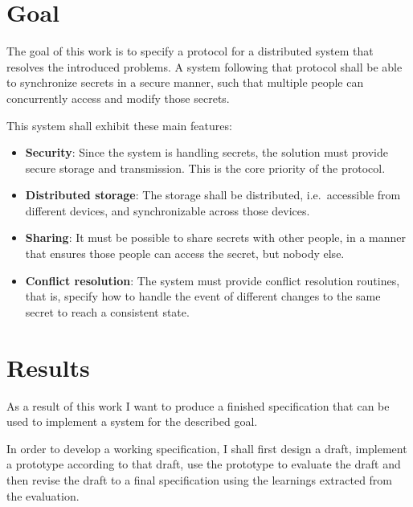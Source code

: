 \section{Goal}

The goal of this work is to specify a protocol for a distributed system that
resolves the introduced problems. A system following that protocol shall be
able to synchronize secrets in a secure manner, such that multiple people can
concurrently access and modify those secrets.

This system shall exhibit these main features:

\begin{itemize}
    \item \textbf{Security}: Since the system is handling secrets, the solution
        must provide secure storage and transmission. This is the core priority
        of the protocol.

    \item \textbf{Distributed storage}: The storage shall be distributed, i.e.\ 
        accessible from different devices, and synchronizable across those
        devices. 

    \item \textbf{Sharing}: It must be possible to share secrets with other
        people, in a manner that ensures those people can access the secret,
        but nobody else.
        
    \item \textbf{Conflict resolution}: The system must provide conflict
        resolution routines, that is, specify how to handle the event of
        different changes to the same secret to reach a consistent state.

\end{itemize}

\section{Results}

As a result of this work I want to produce a finished specification that can be
used to implement a system for the described goal.

In order to develop a working specification, I shall first design a draft,
implement a prototype according to that draft, use the prototype to evaluate
the draft and then revise the draft to a final specification using the
learnings extracted from the evaluation.

